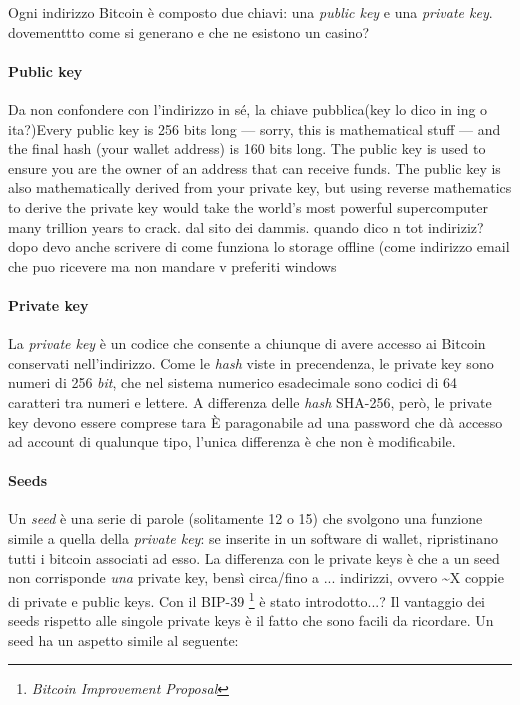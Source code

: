\documentclass {article}
\begin{document}
Ogni indirizzo Bitcoin è composto due chiavi: una \textit{public key} e una \textit{private key}. dovementtto come si generano e che ne esistono un casino?


\paragraph {Public key}


Da non confondere con l'indirizzo in sé, la chiave pubblica(key lo dico in ing o ita?)Every public key is 256 bits long — sorry, this is mathematical stuff — and the final hash (your wallet address) is 160 bits long.
The public key is used to ensure you are the owner of an address that can receive funds.
The public key is also mathematically derived from your private key, but using reverse mathematics to derive the private key would take the world’s most powerful supercomputer many trillion years to crack.
dal sito dei dammis. quando dico n tot indiriziz? dopo devo anche scrivere di come funziona lo storage offline (come indirizzo email che puo ricevere ma non mandare v preferiti windows


\paragraph {Private key}


La \textit{private key} è un codice che consente a chiunque di avere accesso ai Bitcoin conservati nell'indirizzo.
Come le \textit{hash} viste in precendenza, le private key sono numeri di 256 \textit{bit}, che nel sistema numerico esadecimale sono codici di 64 caratteri tra numeri e lettere.
A differenza delle \textit{hash} SHA-256, però, le private key devono essere comprese tara 
È paragonabile ad una password che dà accesso ad account di qualunque tipo, l'unica differenza è che non è modificabile.


\paragraph {Seeds}


Un \textit{seed} è una serie di parole (solitamente 12 o 15) che svolgono una funzione simile a quella della \textit{private key}: se inserite in un software di wallet, ripristinano tutti i bitcoin associati ad esso.
La differenza con le private keys è che a un seed non corrisponde \emph{una} private key, bensì circa/fino a ... indirizzi, ovvero \textasciitilde X coppie di private e public keys.
Con il BIP-39 \footnote{\textit{Bitcoin Improvement Proposal}} è stato introdotto...?
Il vantaggio dei seeds rispetto alle singole private keys è il fatto che sono facili da ricordare. Un seed ha un aspetto simile al seguente:
\end{document}
